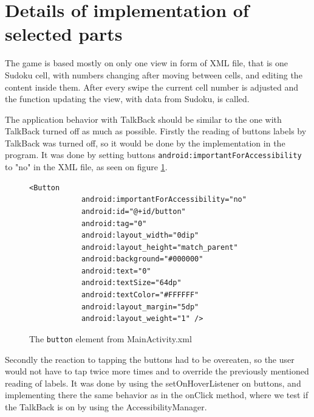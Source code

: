 \documentclass[a4paper,twoside,12pt]{book}
\begin{document}
\section {Details of implementation of selected parts}

\par The game is based mostly on only one view in form of XML file, that is one Sudoku cell, with numbers changing after moving between cells, and editing the content inside them. After every swipe the current cell number is adjusted and the function updating the view, with data from Sudoku, is called.
\par The application behavior with TalkBack should be similar to the one with TalkBack turned off as much as possible. Firstly the reading of buttons labels by TalkBack was turned off, so it would be done by the implementation in the program. It was done by setting buttons \lstinline|android:importantForAccessibility| to "no" in the XML file, as seen on figure \ref{fig:Button}.


\begin{figure}[H]
\centering
\begin{lstlisting}
<Button
            android:importantForAccessibility="no"
            android:id="@+id/button"
            android:tag="0"
            android:layout_width="0dip"
            android:layout_height="match_parent"
            android:background="#000000"
            android:text="0"
            android:textSize="64dp"
            android:textColor="#FFFFFF"
            android:layout_margin="5dp"
            android:layout_weight="1" />
\end{lstlisting}
\caption{The \lstinline|button| element from MainActivity.xml}
\label{fig:Button}
\end{figure}


\par Secondly the reaction to tapping the buttons had to be overeaten, so the user would not have to tap twice more times and to override the previously mentioned reading of labels. It was done by using the setOnHoverListener on buttons, and implementing there the same behavior as in the onClick method, where we test if the TalkBack is on by using the AccessibilityManager.


\end{document}
